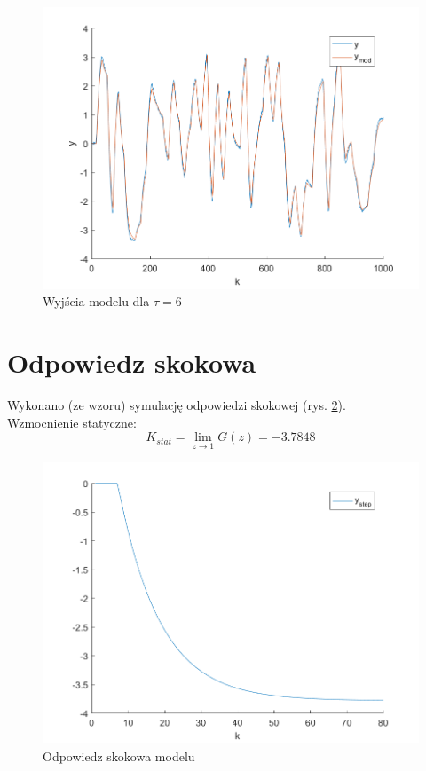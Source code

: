 \documentclass[a4paper, 10pt]{article}
\begin{document}
	\begin{figure}[H]
	\centering
	\includegraphics[width=0.9\linewidth]{z1_6}
	\caption{Wyjścia modelu dla $\tau=6$}
	\label{fig:z1_6}
	\end{figure}

	\section{Odpowiedz skokowa}
	Wykonano (ze wzoru) symulację odpowiedzi skokowej (rys. \ref{fig:z2}).\\
	Wzmocnienie statyczne:
	\[K_{stat}=\lim_{z\rightarrow 1}G(z)=-3.7848\]
	\begin{figure}[H]
		\centering
		\includegraphics[width=0.9\linewidth]{z2}
		\caption{Odpowiedz skokowa modelu}
		\label{fig:z2}
		\end{figure}
\end{document}
